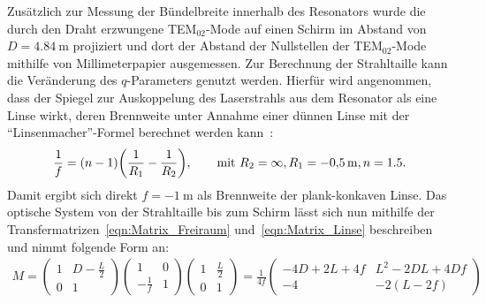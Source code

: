 \documentclass[a4paper,twoside,final]{article}
\begin{document}
Zusätzlich zur Messung der Bündelbreite innerhalb des Resonators wurde die durch den Draht erzwungene TEM$_{02}$-Mode auf einen Schirm im Abstand von $D = \SI{4.84}{\metre}$ projiziert und dort der Abstand der Nullstellen der TEM$_{02}$-Mode mithilfe von Millimeterpapier ausgemessen. Zur Berechnung der Strahltaille kann die Veränderung des $q$-Parameters genutzt werden. Hierfür wird angenommen, dass der Spiegel zur Auskoppelung des Laserstrahls aus dem Resonator als eine Linse wirkt, deren Brennweite unter Annahme einer dünnen Linse mit der ``Linsenmacher''-Formel berechnet werden kann~\cite{Hecht}:
\begin{align}
  \frac{1}{f} = (n-1)\qty(\frac{1}{R_1}-\frac{1}{R_2}), \qquad \text{mit } R_2 = \infty, R_1 = -\SI{0.5}{\metre}, n = 1.5.
\end{align}
Damit ergibt sich direkt $f = -\SI{1}{\metre}$ als Brennweite der plank-konkaven Linse. Das optische System von der Strahltaille bis zum Schirm lässt sich nun mithilfe der Transfermatrizen~\eqref{eqn:Matrix_Freiraum} und~\eqref{eqn:Matrix_Linse} beschreiben und nimmt folgende Form an:
\begin{align}\label{eqn:Transfermatrix_Praxis}
  M = \begin{pmatrix}
    1 & D-\frac{L}{2} \\ 0 & 1
\end{pmatrix} \begin{pmatrix}
  1 & 0 \\ -\frac{1}{f} & 1
\end{pmatrix} \begin{pmatrix}
  1 & \frac{L}{2} \\ 0 & 1
\end{pmatrix} = \frac{1}{4f} \begin{pmatrix}
  -4D+2L +4f & L^2 - 2DL + 4Df \\ -4 & -2(L-2f)
\end{pmatrix}
\end{align}
\end{document}
